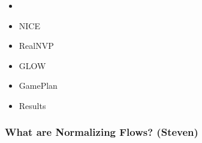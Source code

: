 \begin{frame}
\begin{itemize}
    \item \textbf{\color{red}{What are Normalizing Flows}}
    \item NICE
    \item RealNVP
    \item GLOW
    \item GamePlan
    \item Results
\end{itemize}
\end{frame}

\begin{frame}
    \frametitle{What are Normalizing Flows? (Steven)}
\end{frame}
